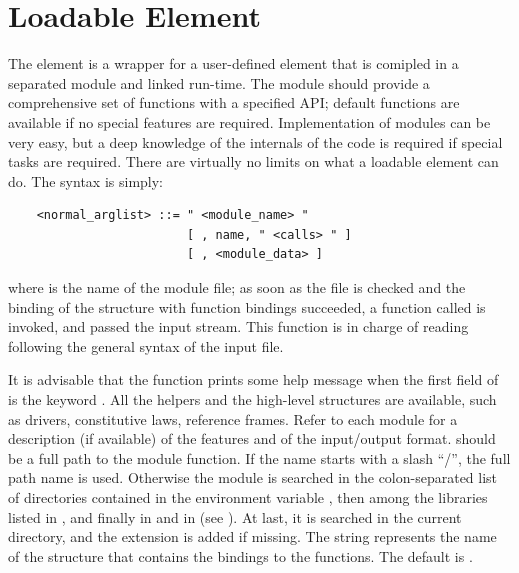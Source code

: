 \section{Loadable Element}
The  element is a wrapper for a user-defined element that is
comipled in a separated module and linked run-time.
The module should provide a comprehensive set of functions with a specified
API; default functions are available if no special features are required.
Implementation of modules can be very easy, but a deep knowledge of the
internals of the code is required if special tasks are required. 
There are virtually no limits on what a loadable element can do.
The syntax is simply:
\begin{verbatim}
    <normal_arglist> ::= " <module_name> "
                         [ , name, " <calls> " ] 
                         [ , <module_data> ]
\end{verbatim}
where  is the name of the module file; as soon as the file
is checked and the binding of the structure with function bindings 
succeeded, a function called  is invoked, and passed the input
stream.
This function is in charge of reading  following the
general syntax of the input file.

It is advisable that the function  prints some help message
when the first field of  is the keyword .
All the helpers and the high-level structures are available, such as
drivers, constitutive laws, reference frames.
Refer to each module for a description (if available) of the features and of
the input/output format.
 should be a full path to the module function.
If the name starts with a slash ``/'', the full path name is used.
Otherwise the module is searched in the colon-separated list of directories 
contained in the environment variable , then among the
libraries listed in , and finally in
 and in  (see ).
At last, it is searched in the current directory, and the extension
 is added if missing.
The string  represents the name of the structure that contains
the bindings to the functions.
The default is .

